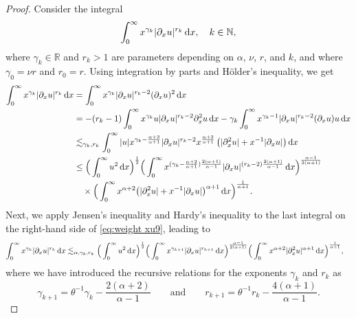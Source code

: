 \documentclass[reqno,12pt]{amsart}
\renewcommand{\d}{\ensuremath{\mathrm{d}}}
\newcommand{\R}{\ensuremath{\mathbb{R}}}
\newcommand{\N}{\ensuremath{\mathbb{N}}}
\renewcommand{\d}{\ensuremath{{\rm d}}}
\numberwithin{equation}{section}
\begin{document}
\begin{proof}
%
Consider the integral
%
\[
\int_0^\infty x^{\gamma_k} |\partial_x u|^{r_k} \, \d x, \quad k\in \N,
\]
%
where $\gamma_k \in \R$ and $r_k > 1$ are parameters depending on $\alpha$, $\nu$, $r$, and $k$, and where $\gamma_0 = \nu r$ and $r_0 = r$. Using integration by parts and H\"older’s inequality, we get
%
\begin{align}
\int_0^\infty x^{\gamma_k} |\partial_x u|^{r_k} \, \d x 
&= \int_0^\infty x^{\gamma_k} |\partial_x u|^{r_k-2} (\partial_x u)^2 \, \d x \nonumber \\
&= - (r_k-1) \int_0^\infty x^{\gamma_k} u |\partial_x u|^{r_k-2} \partial_x^2 u \, \d x - \gamma_k \int_0^\infty x^{\gamma_k-1} |\partial_x u|^{r_k-2} (\partial_x u) u \, \d x \nonumber \\
&\lesssim_{\gamma_k, r_k} 
\int_0^\infty |u| x^{\gamma_k-\frac{\alpha+2}{\alpha+1}}  |\partial_x u|^{r_k -2} 
x^{\frac{\alpha+2}{\alpha+1}} \left( |\partial_x^2 u| + x^{-1} |\partial_x u|\right) \d x \nonumber \\
&\leq \Big(  \int_0^\infty  u^2 \, \d x \Big)^{\frac{1}{2}} 
\Big( \int_0^\infty x^{(\gamma_k - \frac{\alpha+2}{\alpha +1})\frac{2(\alpha+1)}{\alpha-1}}
 |\partial_x u|^{(r_k-2)\frac{2(\alpha +1)}{\alpha -1}} \, \d x \Big)^{\frac{\alpha -1}{2(\alpha+1)}} \nonumber \\
&\quad
\times \Big( \int_0^\infty x^{\alpha +2} 
\big( |\partial_x^2 u| + x^{-1} |\partial_x u|\big)^{\alpha +1} \, \d x \Big)^{\frac{1}{\alpha+1}}. \label{eq:weight xu9}
\end{align}
%
Next, we apply Jensen’s inequality and Hardy’s inequality to the last integral on the right-hand side of \eqref{eq:weight xu9}, leading to
%
\begin{align} \label{eq:weight xu10}
\int_0^\infty x^{\gamma_k} |\partial_x u|^{r_k} \, \d x &\lesssim_{\alpha,\gamma_k, r_k}  \Big(  \int_0^\infty  u^2 \, \d x \Big)^{\frac{1}{2}} \Big( \int_0^\infty x^{\gamma_{k+1}}
|\partial_x u|^{r_{k+1}} \, \d x \Big)^{\frac{\alpha -1}{2(\alpha+1)}} 
\Big( \int_0^\infty  x^{\alpha+2} |\partial_x^2 u|^{\alpha+1} \, \d x\Big)^{\frac{1}{\alpha+1}},
\end{align}
%
where we have introduced the recursive relations for the exponents $\gamma_k$ and $r_k$ as 
%
\begin{equation}\label{eq:gamma r}
	\gamma_{k+1} = \theta^{-1} \gamma_k - \frac{2(\alpha +2)}{\alpha -1} 
\qquad \text{and}\qquad r_{k+1} = \theta^{-1} r_k - \frac{4(\alpha +1)}{\alpha -1}. 
\end{equation}

\end{proof}
\end{document}
